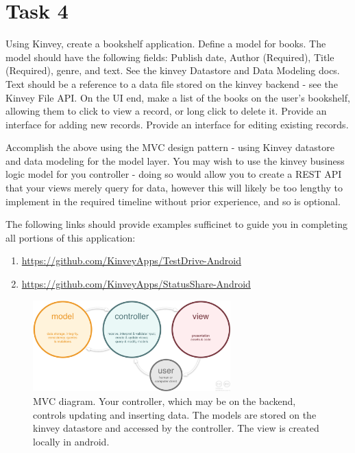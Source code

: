 \documentclass{article}
\begin{document}
\clearpage
\section{Task 4}
Using Kinvey, create a bookshelf application.
Define a model for books.
The model should have the following fields: Publish date, Author (Required), Title (Required), genre, and text. See the kinvey Datastore and Data Modeling docs. 
Text should be a reference to a data file stored on the kinvey backend - see the Kinvey File API.
On the UI end, make a list of the books on the user's bookshelf, allowing them to click to view a record, or long click to delete it.
Provide an interface for adding new records.
Provide an interface for editing existing records.

Accomplish the above using the MVC design pattern - using Kinvey datastore and data modeling for the model layer.
You may wish to use the kinvey business logic model for you controller - doing so would allow you to create a REST API that your views merely query for data, however this will likely be too lengthy to implement in the required timeline without prior experience, and so is optional.

The following links should provide examples sufficinet to guide you in completing all portions of this application:
\begin{enumerate}
\item \url{https://github.com/KinveyApps/TestDrive-Android}
\item \url{https://github.com/KinveyApps/StatusShare-Android}
\end{enumerate}

\begin{figure}[ht]
      \includegraphics[width=3in]{img/mvc.png}
      \centering
      \caption{MVC diagram. Your controller, which may be on the backend, controls updating and inserting data. The models are stored on the kinvey datastore and accessed by the controller. The view is created locally in android.}
\end{figure}
\end{document}
